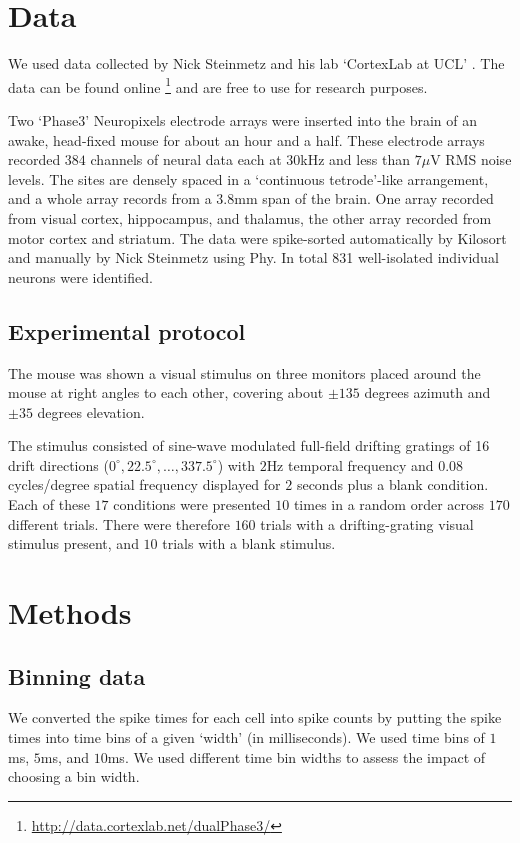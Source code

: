 \section{Data}
We used data collected by Nick Steinmetz and his lab `CortexLab at UCL'  \parencite{steinmetz}. The data can be found online \footnote{\url{http://data.cortexlab.net/dualPhase3/}} and are free to use for research purposes.

Two `Phase3' Neuropixels  \parencite{jun} electrode arrays were inserted into the brain of an awake, head-fixed mouse for about an hour and a half. These electrode arrays recorded $384$ channels of neural data each at $30$kHz and  less than $7\mu$V RMS noise levels. The sites are densely spaced in a `continuous tetrode'-like arrangement, and a whole array records from a $3.8$mm span of the brain. One array recorded from visual cortex, hippocampus,  and thalamus, the other array recorded from motor cortex and striatum. The data were spike-sorted automatically by Kilosort and manually by Nick Steinmetz using Phy. In total 831 well-isolated individual neurons were identified.

  \subsection{Experimental protocol}\label{sec:experimental_protocal}
  The mouse was shown a visual stimulus on three monitors placed around the mouse at right angles to each other, covering about $\pm 135$ degrees azimuth and $\pm 35$ degrees elevation.

  The stimulus consisted of sine-wave modulated full-field drifting gratings of 16 drift directions ($0^{\circ}, 22.5^{\circ}, \dots, 337.5^{\circ}$) with $2$Hz temporal frequency and $0.08$ cycles/degree spatial frequency displayed for $2$ seconds plus a blank condition. Each of these $17$ conditions were presented $10$ times in a random order across $170$ different trials. There were therefore $160$ trials with a drifting-grating visual stimulus present, and $10$ trials with a blank stimulus.

\section{Methods}

    \subsection{Binning data}
    We converted the spike times for each cell into spike counts by putting the spike times into time bins of a given `width' (in milliseconds). We used time bins of $1$ms, $5$ms, and $10$ms. We used different time bin widths to assess the impact of choosing a bin width.


